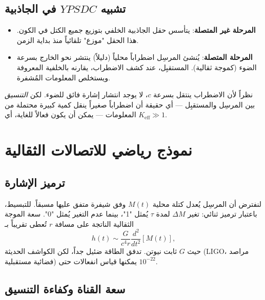\documentclass[11pt,a4paper]{article}
\newcommand{\Keff}{K_{\mathrm{eff}}}
\newcommand{\YPSDC}{YPSDC}
\begin{document}
	\subsection{تشبيه \(\YPSDC\) في الجاذبية}
	
	\begin{itemize}
		\item \textbf{المرحلة غير المتصلة}: يتأسس حقل الجاذبية الخلفي بتوزيع جميع الكتل في الكون. هذا الحقل "موزع" تلقائياً منذ بداية الزمن.
		\item \textbf{المرحلة المتصلة}: يُنشئ المرسِل اضطراباً محلياً (دليلاً) ينتشر نحو الخارج بسرعة الضوء (كموجة ثقالية). المستقبِل، عند كشف الاضطراب، يقارنه بالخلفية المعروفة ويستخلص المعلومات المُشفرة.
	\end{itemize}
	
	نظراً لأن الاضطراب ينتقل بسرعة \(c\)، لا يوجد انتشار إشارة فائق للضوء. لكن \emph{التنسيق} بين المرسِل والمستقبِل — أي حقيقة أن اضطراباً صغيراً ينقل كمية كبيرة محتملة من المعلومات — يمكن أن يكون فعالاً للغاية، أي \(\Keff \gg 1\).
	
	\section{نموذج رياضي للاتصالات الثقالية}
	\label{sec:model}
	
	\subsection{ترميز الإشارة}
	
	لنفترض أن المرسِل يُعدل كتلة محلية \(M(t)\) وفق شيفرة متفق عليها مسبقاً. للتبسيط، باعتبار ترميز ثنائي: تغير \(\Delta M\) لمدة \(\tau\) يُمثل "1"، بينما عدم التغير يُمثل "0". سعة الموجة الثقالية الناتجة على مسافة \(r\) تُعطى تقريباً بـ
	\begin{equation}
		h(t) \sim \frac{G}{c^4 r} \frac{d^2}{dt^2} \left[ M(t) \right],
	\end{equation}
	حيث \(G\) ثابت نيوتن. تدفق الطاقة ضئيل جداً، لكن الكواشف الحديثة (LIGO، مراصد فضائية مستقبلية) يمكنها قياس انفعالات حتى \(10^{-22}\).
	
	\subsection{سعة القناة وكفاءة التنسيق}
	
\end{document}
